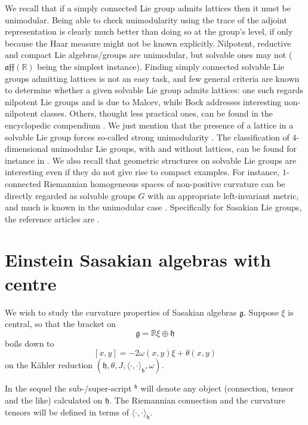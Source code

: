 \documentclass[12pt, twoside]{amsart}
\def\g{\mathfrak{g}}
\def\h{\mathfrak{h}}
\def\R{\mathbb{R}}
\def\aff{\mathfrak{aff}}
\def\pint{\langle \cdotp,\cdotp \rangle }
\theoremstyle{definition}
\begin{document}
We recall that if a simply connected Lie group admits lattices then it must be unimodular. Being able to check unimodularity using the trace of the adjoint representation is clearly much better than doing so at the group's level, if only because the Haar measure might not be known explicitly. Nilpotent, reductive and compact Lie algebras/groups are unimodular, but solvable ones may not ($\aff(\R)$ being the simplest instance). Finding simply connected solvable Lie groups admitting lattices is not an easy task, and few general criteria are known to determine whether a given solvable Lie group admits lattices: one such regards nilpotent Lie groups and is due to Malcev, while Bock \cite{Bo} addresses   interesting non-nilpotent classes. Others, thought less practical ones, can be found in the encyclopedic compendium \cite[Ch.2, \S 3.7]{VGS}. We just mention that the presence of a lattice in a solvable Lie group forces so-called strong unimodularity \cite{Garland}. 
The classification of $4$-dimensional unimodular Lie groups, with and without lattices, can be found for instance in \cite{Keizo-Kamishima}. 
We also recall that geometric structures on solvable Lie groups are interesting even if they do not give rise to compact examples. For instance, $1$-connected Riemannian homogeneous spaces of non-positive curvature can be directly regarded as solvable groups $G$ with an appropriate left-invariant metric, and much is known in the unimodular case \cite{Mil, AW1,AW2}. 
Specifically for Sasakian Lie groups, the reference articles are  
\cite{Dalek-Vicente-Keizo-Kamishima, Dalek-Keizo-Kamishima, Cortes}.


\section{Einstein Sasakian algebras with centre}\label{sec:ES with centre} 

We wish to study the curvature properties of Sasakian algebras $\g$. Suppose $\xi$ is central, so that the bracket on 
\[\g=\R\xi \oplus \h\]
boils down to 
\begin{equation}\label{corchete de extension}
    [x,y]=-2\omega(x,y)\xi+\theta(x,y) 
\end{equation}
on the K{\"a}hler reduction $(\h, \theta, J, \pint_\h, \omega)$.  
\medbreak

In the sequel the sub-/super-script $^\h$ will denote any object (connection, tensor and the like) calculated on $\h$. The Riemannian connection and the  curvature tensors will be defined in terms of $\pint_\h$.
 
\end{document}
